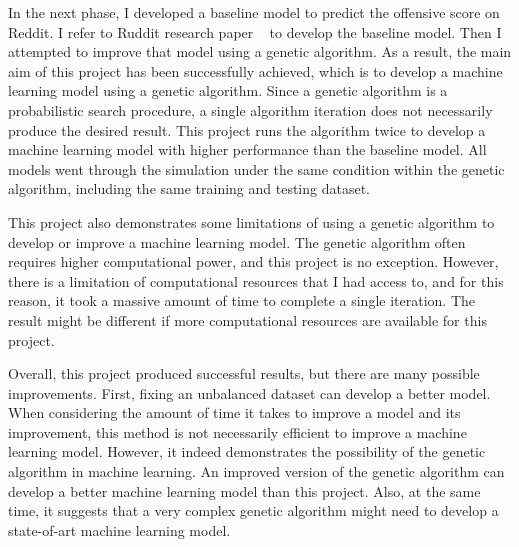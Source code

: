 \documentclass[11pt, natbib=false]{article}
\begin{document}
In the next phase, I developed a baseline model to predict the offensive score on Reddit.
I refer to Ruddit research paper ~\cite{hada2021ruddit} to develop the baseline model.
Then I attempted to improve that model using a genetic algorithm.
As a result, the main aim of this project has been successfully achieved, which is to develop a machine learning model using a genetic algorithm.
Since a genetic algorithm is a probabilistic search procedure, a single algorithm iteration does not necessarily produce the desired result.
This project runs the algorithm twice to develop a machine learning model with higher performance than the baseline model.
All models went through the simulation under the same condition within the genetic algorithm, including the same training and testing dataset.

This project also demonstrates some limitations of using a genetic algorithm to develop or improve a machine learning model.
The genetic algorithm often requires higher computational power, and this project is no exception.
However, there is a limitation of computational resources that I had access to, and for this reason, it took a massive amount of time to complete a single iteration.
The result might be different if more computational resources are available for this project.

Overall, this project produced successful results, but there are many possible improvements.
First, fixing an unbalanced dataset can develop a better model.
When considering the amount of time it takes to improve a model and its improvement, this method is not necessarily efficient to improve a machine learning model.
However, it indeed demonstrates the possibility of the genetic algorithm in machine learning.
An improved version of the genetic algorithm can develop a better machine learning model than this project.
Also, at the same time, it suggests that a very complex genetic algorithm might need to develop a state-of-art machine learning model.



\newpage
\printbibliography
\newpage
\end{document}
